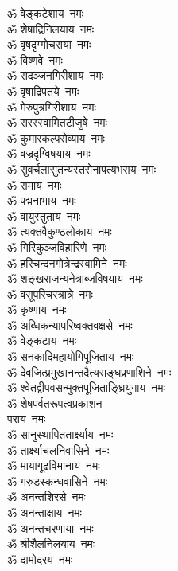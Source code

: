 \begin{multicols}{2}
\begin{flushleft}
ॐ वेङ्कटेशाय~नमः\\
ॐ शेषाद्रिनिलयाय~नमः\\
ॐ वृषदृग्गोचराया~नमः\\
ॐ विष्णवे~नमः\\
ॐ सदञ्जनगिरीशाय~नमः\\
ॐ वृषाद्रिपतये~नमः\\
ॐ मेरुपुत्रगिरीशाय~नमः\\
ॐ सरस्स्वामितटीजुषे~नमः\\
ॐ कुमारकल्पसेव्याय~नमः\\
ॐ वज्रदृग्विषयाय~नमः\hfill{}\\
ॐ सुवर्चलासुत\-न्यस्तसेनापत्यभराय~नमः\\
ॐ रामाय~नमः\\
ॐ पद्मनाभाय~नमः\\
ॐ वायुस्तुताय~नमः\\
ॐ त्यक्तवैकुण्ठलोकाय~नमः\\
ॐ गिरिकुञ्जविहारिणे~नमः\\
ॐ हरिचन्दनगोत्रेन्द्रस्वामिने~नमः\\
ॐ शङ्खराजन्यनेत्राब्जविषयाय~नमः\\
ॐ वसूपरिचरत्रात्रे~नमः\\
ॐ कृष्णाय~नमः\hfill{}\\
ॐ अब्धिकन्यापरिष्वक्तवक्षसे~नमः\\
ॐ वेङ्कटाय~नमः\\
ॐ सनकादिमहायोगि\-पूजिताय~नमः\\
ॐ देवजित्प्रमुखानन्त\-दैत्यसङ्घप्रणाशिने~नमः\\
ॐ श्वेतद्वीप\-वसन्मुक्तपूजिताङ्घ्रियुगाय~नमः\\
ॐ शेषपर्वत\-रूपत्वप्रकाशन-\\पराय~नमः\\
ॐ सानुस्थापिततार्क्ष्याय~नमः\\
ॐ तार्क्ष्याचलनिवासिने~नमः\\
ॐ मायागूढविमानाय~नमः\\
ॐ गरुडस्कन्धवासिने~नमः\hfill{}\\
ॐ अनन्तशिरसे~नमः\\
ॐ अनन्ताक्षाय~नमः\\
ॐ अनन्तचरणाया~नमः\\
ॐ श्रीशैलनिलयाय~नमः\\
ॐ दामोदरय~नमः\\

\end{flushleft}
\end{multicols}
